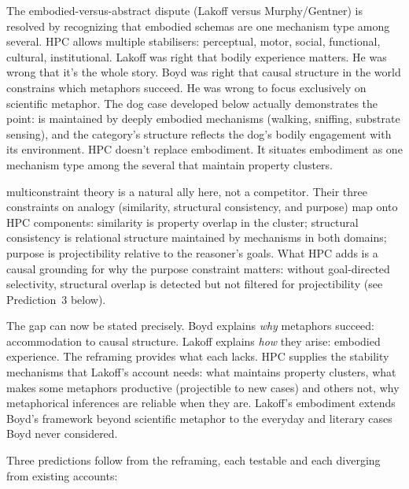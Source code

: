 \documentclass[12pt]{article}
\begin{document}
The embodied-versus-abstract dispute (Lakoff versus Murphy/Gentner) is resolved by recognizing that embodied schemas are one mechanism type among several. HPC allows multiple stabilisers: perceptual, motor, social, functional, cultural, institutional. Lakoff was right that bodily experience matters. He was wrong that it's the whole story. Boyd was right that causal structure in the world constrains which metaphors succeed. He was wrong to focus exclusively on scientific metaphor. The dog case developed below actually demonstrates the point:  is maintained by deeply embodied mechanisms (walking, sniffing, substrate sensing), and the category's structure reflects the dog's bodily engagement with its environment. HPC doesn't replace embodiment. It situates embodiment as one mechanism type among the several that maintain property clusters.

 multiconstraint theory is a natural ally here, not a competitor. Their three constraints on analogy (similarity, structural consistency, and purpose) map onto HPC components: similarity is property overlap in the cluster; structural consistency is relational structure maintained by mechanisms in both domains; purpose is projectibility relative to the reasoner's goals. What HPC adds is a causal grounding for why the purpose constraint matters: without goal-directed selectivity, structural overlap is detected but not filtered for projectibility (see Prediction~3 below).

The gap can now be stated precisely. Boyd explains \emph{why} metaphors succeed: accommodation to causal structure. Lakoff explains \emph{how} they arise: embodied experience. The reframing provides what each lacks. HPC supplies the stability mechanisms that Lakoff's account needs: what maintains property clusters, what makes some metaphors productive (projectible to new cases) and others not, why metaphorical inferences are reliable when they are. Lakoff's embodiment extends Boyd's framework beyond scientific metaphor to the everyday and literary cases Boyd never considered.

Three predictions follow from the reframing, each testable and each diverging from existing accounts:
\end{document}

